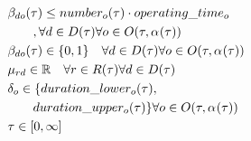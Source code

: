 \begin{alignat}{2}
			   & \beta_{do}(\tau) \leq number_{o}(\tau) \cdot operating\_time_{o} \notag                                                     \\ 
			   & \quad \quad ,\forall d \in D(\tau) \forall o \in O(\tau, \alpha_{}(\tau) )                                                                  \\
			   & \beta_{do}(\tau) \in \{0, 1\} \quad \forall d \in D(\tau) \forall o \in O(\tau, \alpha_{}(\tau) )                                         \\
			   & \mu_{rd} \in \mathbb{R} \quad \forall r \in R(\tau) \forall d \in D(\tau)                                        \\
			   & \delta_o \in \{ duration\_lower_{o}(\tau), \notag\\
			   & \quad \quad duration\_upper_{o}(\tau) \} \forall o \in O(\tau, \alpha_{}(\tau) )                                      \\
			   & \tau \in  [0, \infty] 
\end{alignat}

